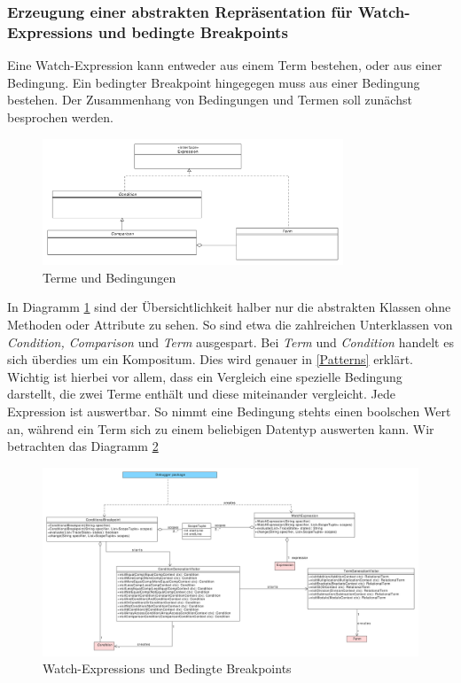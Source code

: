 \documentclass[parskip=full]{scrartcl}
\begin{document}
\subsubsection{Erzeugung einer abstrakten Repräsentation für Watch-Expressions und bedingte Breakpoints}
Eine Watch-Expression kann entweder aus einem Term bestehen, oder aus einer Bedingung. Ein bedingter Breakpoint hingegegen muss aus einer Bedingung bestehen. Der Zusammenhang von Bedingungen und Termen soll zunächst besprochen werden.
\begin{figure}[!h]
\centering
\includegraphics[width=0.8\textwidth]{diagrammIdeenUmlet/ConditionTerm.pdf}
\caption{Terme und Bedingungen}
\label{Terme}
\end{figure}
In Diagramm \ref{Terme} sind der Übersichtlichkeit halber nur die abstrakten Klassen ohne Methoden oder Attribute zu sehen. So sind etwa die zahlreichen Unterklassen von \textit{Condition, Comparison} und  \textit{Term} ausgespart. Bei \textit{Term} und \textit{Condition} handelt es sich überdies um ein Kompositum. Dies wird genauer in \ref{Patterns} erklärt. Wichtig ist hierbei vor allem, dass ein Vergleich eine spezielle Bedingung darstellt, die zwei Terme enthält und diese miteinander vergleicht. Jede Expression ist auswertbar. So nimmt eine Bedingung stehts einen boolschen Wert an, während ein Term sich zu einem beliebigen Datentyp auswerten kann. 
Wir betrachten das Diagramm \ref{WEBBP} 
\begin{figure}[!h]
\centering
\includegraphics[width=1.2\textwidth]{diagrammIdeenUmlet/WatchExpressions.pdf}
\caption{Watch-Expressions und Bedingte Breakpoints}
\label{WEBBP}
\end{figure}
\end{document}
